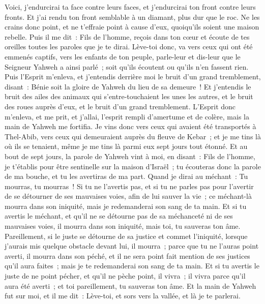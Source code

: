 \begin{multicols}{2}
Voici, j'endurcirai ta face contre leurs faces, et j'endurcirai ton front contre leurs fronts.
Et j'ai rendu ton front semblable à un diamant, plus dur que le roc. Ne les crains donc point, et ne t'effraie point à cause d'eux, quoiqu'ils soient une maison rebelle.
Puis il me dit~: Fils de l'homme, reçois dans ton cœur et écoute de tes oreilles toutes les paroles que je te dirai.
Lève-toi donc, va vers ceux qui ont été emmenés captifs, vers les enfants de ton peuple, parle-leur et dis-leur que le Seigneur Yahweh a ainsi parlé~; soit qu'ils écoutent ou qu'ils n'en fassent rien.
Puis l'Esprit m'enleva, et j'entendis derrière moi le bruit d'un grand tremblement, disant~: Bénie soit la gloire de Yahweh du lieu de sa demeure~!
Et j'entendis le bruit des ailes des animaux qui s'entre-touchaient les unes les autres, et le bruit des roues auprès d'eux, et le bruit d'un grand tremblement.
L'Esprit donc m'enleva, et me prit, et j'allai, l'esprit rempli d'amertume et de colère, mais la main de Yahweh me fortifia.
Je vins donc vers ceux qui avaient été transportés à Thel-Abib, vers ceux qui demeuraient auprès du fleuve de Kebar~; et je me tins là où ils se tenaient, même je me tins là parmi eux sept jours tout étonné.
Et au bout de sept jours, la parole de Yahweh vint à moi, en disant~:
Fils de l'homme, je t'établis pour être sentinelle sur la maison d'Israël~; tu écouteras donc la parole de ma bouche, et tu les avertiras de ma part.
Quand je dirai au méchant~: Tu mourras, tu mourras~! Si tu ne l'avertis pas, et si tu ne parles pas pour l'avertir de se détourner de ses mauvaises voies, afin de lui sauver la vie~; ce méchant-là mourra dans son iniquité, mais je redemanderai son sang de ta main.
Et si tu avertis le méchant, et qu'il ne se détourne pas de sa méchanceté ni de ses mauvaises voies, il mourra dans son iniquité, mais toi, tu sauveras ton âme.
Pareillement, si le juste se détourne de sa justice et commet l'iniquité, lorsque j'aurais mis quelque obstacle devant lui, il mourra~; parce que tu ne l'auras point averti, il mourra dans son péché, et il ne sera point fait mention de ses justices qu'il aura faites~; mais je te redemanderai son sang de ta main.
Et si tu avertis le juste de ne point pécher, et qu'il ne pèche point, il vivra~; il vivra parce qu'il aura été averti~; et toi pareillement, tu sauveras ton âme.
Et la main de Yahweh fut sur moi, et il me dit~: Lève-toi, et sors vers la vallée, et là je te parlerai.

\end{multicols}

